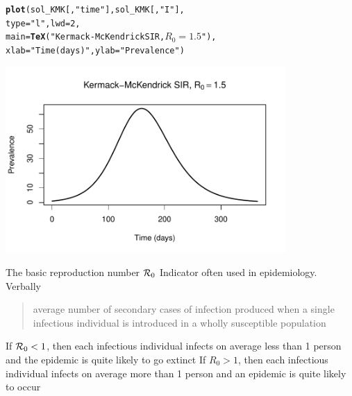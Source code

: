 \documentclass[aspectratio=169]{beamer}\usepackage[]{graphicx}\usepackage[]{xcolor}
\makeatletter
\newcommand{\hlnum}[1]{\textcolor[rgb]{0.686,0.059,0.569}{#1}}%
\newcommand{\hlsng}[1]{\textcolor[rgb]{0.192,0.494,0.8}{#1}}%
\newcommand{\hldef}[1]{\textcolor[rgb]{0.345,0.345,0.345}{#1}}%
\newcommand{\hlkwc}[1]{\textcolor[rgb]{0.333,0.667,0.333}{#1}}%
\newcommand{\hlkwd}[1]{\textcolor[rgb]{0.737,0.353,0.396}{\textbf{#1}}}%
\newenvironment{kframe}{%
 \def\at@end@of@kframe{}%
 \ifinner\ifhmode%
  \def\at@end@of@kframe{\end{minipage}}%
  \begin{minipage}{\columnwidth}%
 \fi\fi%
 \def\FrameCommand##1{\hskip\@totalleftmargin \hskip-\fboxsep
 \colorbox{shadecolor}{##1}\hskip-\fboxsep
     \hskip-\linewidth \hskip-\@totalleftmargin \hskip\columnwidth}%
 \MakeFramed {\advance\hsize-\width
   \@totalleftmargin\z@ \linewidth\hsize
   \@setminipage}}%
 {\par\unskip\endMakeFramed%
 \at@end@of@kframe}
\newenvironment{knitrout}{}{} %
\makeatother
\begin{document}
\begin{frame}[fragile]{}
\begin{knitrout}
\color{fgcolor}\begin{kframe}
\begin{alltt}
\hlkwd{plot}\hldef{(sol_KMK[,} \hlsng{"time"}\hldef{], sol_KMK[,} \hlsng{"I"}\hldef{],}
     \hlkwc{type} \hldef{=} \hlsng{"l"}\hldef{,} \hlkwc{lwd} \hldef{=} \hlnum{2}\hldef{,}
     \hlkwc{main} \hldef{=} \hlkwd{TeX}\hldef{(}\hlsng{"Kermack-McKendrick SIR, $R_0=1.5$"}\hldef{),}
     \hlkwc{xlab} \hldef{=} \hlsng{"Time (days)"}\hldef{,} \hlkwc{ylab} \hldef{=} \hlsng{"Prevalence"}\hldef{)}
\end{alltt}
\end{kframe}
\end{knitrout}
\begin{center}
\includegraphics[width=0.8\textwidth]{FIGS/course-01-KMK_R0eq1dot5-1.pdf}
\end{center}
\end{frame}


\begin{frame}{The basic reproduction number $\mathcal{R}_0$}
\bbullet Indicator often used in epidemiology. Verbally
\begin{quote}
  average number of secondary cases of infection produced when a single infectious individual is introduced in a wholly susceptible population
\end{quote}
\vfill
\bbullet If $\mathcal{R}_0<1$, then each infectious individual infects on average less than 1 person and the epidemic is quite likely to go extinct 
\vfill
\bbullet If $R_0>1$, then each infectious individual infects on average more than 1 person and an epidemic is quite likely to occur
\end{frame}
\end{document}

